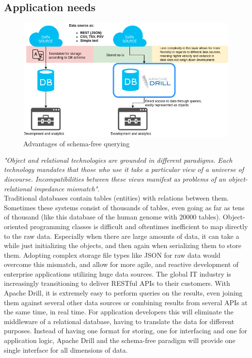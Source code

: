 \documentclass[a4paper,english]{report}
\begin{document}
			\subsection{Application needs}
			\begin{figure}[h]
					\includegraphics[width=\textwidth]{drill_advantages}
					\caption{Advantages of schema-free querying}
			\end{figure}
			\textit{"Object and relational technologies are grounded in
			different paradigms. Each technology mandates that
			those who use it take a particular view of a universe
			of discourse. Incompatibilities between these views
			manifest as problems of an object-relational
			impedance mismatch"}\cite{impedance}.
			\\
			Traditional databases contain tables (entities) with relations between them. Sometimes these systems consist of thousands of tables, even going as far as tens of thousand (like this database of the human genome with 20000 tables\cite{humangenome}). Object-oriented programming classes is difficult and oftentimes inefficient to map directly to the raw data. Especially when there are large amounts of data, it can take a while just initializing the objects, and then again when serializing them to store them. Adopting complex storage file types like JSON for raw data would overcome this mismatch, and allow for more agile, and reactive development of enterprise applications utilizing huge data sources. The global IT industry is increasingly transitioning to deliver RESTful APIs to their customers. With Apache Drill, it is extremely easy to perform queries on the results, even joining them against several other data sources or combining results from several APIs at the same time, in real time. For application developers this will eliminate the middleware of a relational database, having to translate the data for different purposes. Instead of having one format for storing, one for interfacing and one for application logic, Apache Drill and the schema-free paradigm will provide one single interface for all dimensions of data.
		
\end{document}
